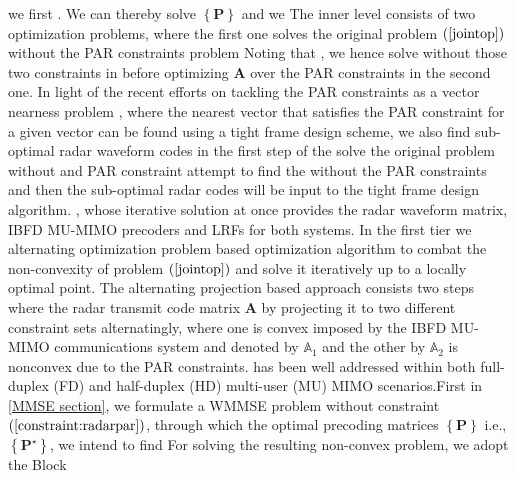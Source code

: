 \documentclass[9pt,journal]{IEEEtran}
\newcommand{\paren}[1]{\left({#1}\right)}
\newcommand{\braces}[1]{{\left\{ {#1}\right\}}}
\theoremstyle{definition}
\begin{document}

  
\iffalse
we first . We can thereby solve $\braces{\mathbf{P}}$  and we The inner level consists of two optimization problems, where the first one solves the original problem $\paren{\ref{jointop}}$ without the PAR constraints  problem Noting that , we hence solve  without those two constraints in  before optimizing $\mathbf{A}$ over the PAR constraints in the second one. In light of the recent efforts on tackling the PAR constraints as a vector nearness problem \cite{NaghshTSP2017,nearestvector}, where the nearest vector that satisfies the PAR constraint for a given vector can be found using a tight frame design scheme, we also find sub-optimal radar waveform codes in the first step of the  solve the original problem without and PAR constraint attempt to find the  without the PAR constraints and then the sub-optimal radar codes will be input to the tight frame design algorithm.  , whose iterative solution at once provides the radar waveform matrix, IBFD MU-MIMO precoders and LRFs for both systems. In the first tier we alternating optimization problem  based optimization algorithm to combat the non-convexity of problem $\paren{\mathrm{\ref{jointop}}}$ and solve it iteratively up to a locally optimal point. The alternating projection based approach consists two steps where the radar transmit code matrix $\mathbf{A}$ by projecting it to two different constraint sets alternatingly, where one is convex imposed by the IBFD MU-MIMO communications system and denoted by $\mathbb{A}_1$ and the other by $\mathbb{A}_2$ is nonconvex due to the PAR constraints. has been well addressed within both full-duplex (FD) and half-duplex (HD) multi-user (MU) MIMO scenarios.First in \ref{MMSE section}, we formulate a WMMSE problem without constraint $\paren{\mathrm{\ref{constraint:radarpar}}}$, through which the optimal precoding matrices $\braces{\mathbf{P}}$ i.e., $\braces{\mathbf{P}^\star}$,  we intend to find 
For solving the resulting non-convex problem, we adopt the Block
\end{document}
